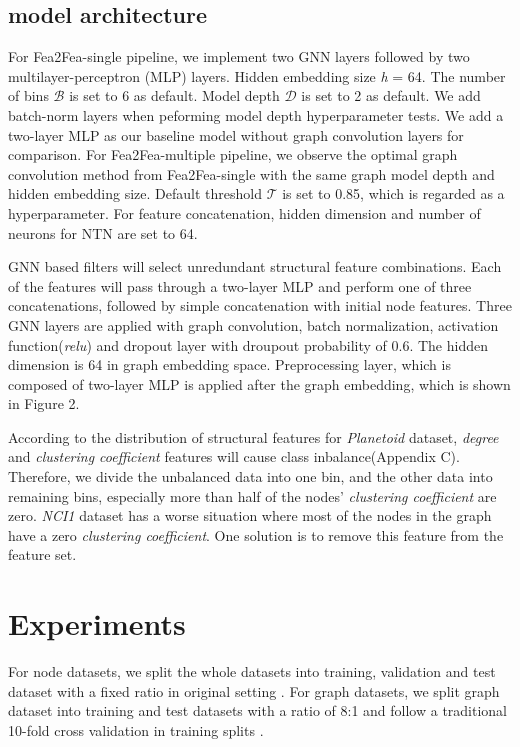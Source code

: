 \documentclass[runningheads]{llncs}
\newcommand{\xhdr}[1]{\vspace{1.7mm}\noindent{{\bf #1}}}
\begin{document}
\subsection{model architecture}
\vspace{-0.4cm}
\xhdr{Fea2Fea} For Fea2Fea-single pipeline, we implement two GNN layers followed by two multilayer-perceptron (MLP) layers. Hidden embedding size \textit{h} = 64. The number of bins $\mathcal B$ is set to 6 as default. Model depth $\mathcal D $ is set to 2 as default. We add batch-norm layers when peforming model depth hyperparameter tests. We add a two-layer MLP as our baseline model without graph convolution layers for comparison. For Fea2Fea-multiple pipeline, we observe the optimal graph convolution method from Fea2Fea-single with the same graph model depth and hidden embedding size. Default threshold $\mathcal T$ is set to 0.85, which is regarded as a hyperparameter. For feature concatenation, hidden dimension and number of neurons for NTN are set to 64. 

\xhdr{Application model} GNN based filters will select unredundant structural feature combinations. Each of the features will pass through a two-layer MLP and perform one of three concatenations, followed by simple concatenation with initial node features. Three GNN layers are applied with graph convolution, batch normalization, activation function(\textit{relu}) and dropout layer with droupout probability of 0.6. The hidden dimension is 64 in graph embedding space. Preprocessing layer, which is composed of two-layer MLP is applied after the graph embedding, which is shown in Figure 2.


\xhdr{Binning methods}
According to the distribution of structural features for \textit{Planetoid} dataset, \textit{degree} and \textit{clustering coefficient} features will cause class inbalance(Appendix C). Therefore, we divide the unbalanced data into one bin, and the other data 
into remaining bins, especially more than half of the nodes' \textit{clustering coefficient} are zero. \textit
{NCI1} dataset has a worse situation where most of the nodes in the graph have a zero 
\textit{clustering coefficient}. One solution is to remove this feature from
the feature set.
\vspace{-0.5cm}
\section{Experiments}
\vspace{-0.3cm}
For node datasets, we split the whole datasets into training, validation 
and test dataset with a fixed ratio in original setting \cite{hamilton2017inductive}. For graph datasets, we split graph 
dataset into training and test datasets with a ratio of 8:1 and follow a traditional 10-fold cross validation in training splits \cite{do2021twostage}.
\end{document}
